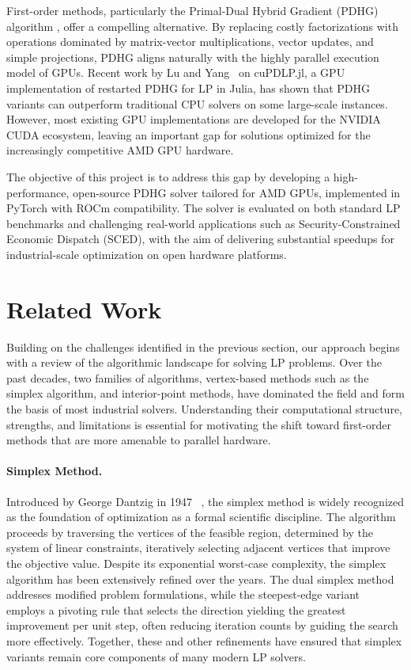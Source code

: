 \documentclass[twoside,12pt,openright]{report}  %
\begin{document}
First-order methods, particularly the Primal-Dual Hybrid Gradient (PDHG) algorithm \cite{chambolle2011first}, offer a compelling alternative. By replacing costly factorizations with operations dominated by matrix-vector multiplications, vector updates, and simple projections, PDHG aligns naturally with the highly parallel execution model of GPUs. Recent work by Lu and Yang~\cite{lu2023cupdlp} on cuPDLP.jl, a GPU implementation of restarted PDHG for LP in Julia, has shown that PDHG variants can outperform traditional CPU solvers on some large-scale instances. However, most existing GPU implementations are developed for the NVIDIA CUDA ecosystem, leaving an important gap for solutions optimized for the increasingly competitive AMD GPU hardware.

The objective of this project is to address this gap by developing a high-performance, open-source PDHG solver tailored for AMD GPUs, implemented in PyTorch with ROCm compatibility. The solver is evaluated on both standard LP benchmarks and challenging real-world applications such as Security-Constrained Economic Dispatch (SCED), with the aim of delivering substantial speedups for industrial-scale optimization on open hardware platforms.

\section{Related Work}
Building on the challenges identified in the previous section, our approach begins with a review of the algorithmic landscape for solving LP problems. Over the past decades, two families of algorithms, vertex-based methods such as the simplex algorithm, and interior-point methods, have dominated the field and form the basis of most industrial solvers. Understanding their computational structure, strengths, and limitations is essential for motivating the shift toward first-order methods that are more amenable to parallel hardware.  

\paragraph{Simplex Method.}  
Introduced by George Dantzig in 1947 ~\cite{dantzig1948programming}, the simplex method is widely recognized as the foundation of optimization as a formal scientific discipline. The algorithm proceeds by traversing the vertices of the feasible region, determined by the system of linear constraints, iteratively selecting adjacent vertices that improve the objective value. Despite its exponential worst-case complexity, the simplex algorithm has been extensively refined over the years. The dual simplex method~\cite{dantzig2016linear} addresses modified problem formulations, while the steepest-edge variant~\cite{forrest1992steepest} employs a pivoting rule that selects the direction yielding the greatest improvement per unit step, often reducing iteration counts by guiding the search more effectively. Together, these and other refinements have ensured that simplex variants remain core components of many modern LP solvers.
\end{document}
